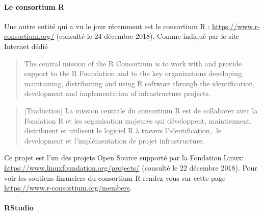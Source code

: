 \documentclass[]{article}
\let\oldparagraph\paragraph
\renewcommand{\paragraph}[1]{\oldparagraph{#1}\mbox{}}
\begin{document}
\hypertarget{le-consortium-r}{%
\paragraph{Le consortium R}\label{le-consortium-r}}

Une autre entité qui a vu le jour récemment est le consortium R :
\url{https://www.r-consortium.org/} (consulté le 24 décembre 2018). Comme indiqué
par le site Internet dédié

\begin{quote}
The central mission of the R Consortium is to work with and provide support to the R Foundation and to the key organizations developing, maintaining, distributing and using R software through the identification, development and implementation of infrastructure projects.
\end{quote}

\begin{quote}
{[}Traduction{]} La mission centrale du consortium R est de collaborer avec la Fondation R et les organisation majeures qui développent, maintiennent, distribuent et utilisent le logiciel R à travers l'identification,. le development et l'implémentation de projet infrastructure.
\end{quote}

Ce projet est l'un des projets Open Source supporté par la Fondation Linux: \url{https://www.linuxfoundation.org/projects/} (consulté le 22 décembre 2018). Pour
voir les soutiens financiers du consortium R rendez vous sur cette page \url{https://www.r-consortium.org/members}.

\hypertarget{rstudio}{%
\paragraph{RStudio}\label{rstudio}}
\end{document}

